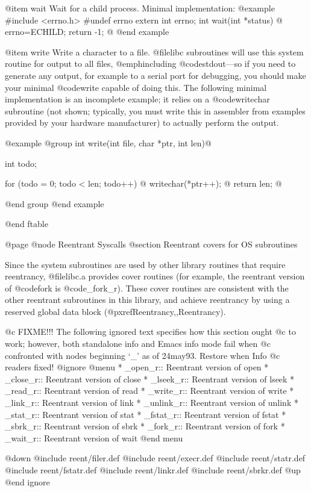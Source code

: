 @item wait
Wait for a child process.  Minimal implementation:
@example
#include <errno.h>
#undef errno
extern int errno;
int wait(int *status) @{
  errno=ECHILD;
  return -1;
@}
@end example

@item write
Write a character to a file.  @file{libc} subroutines will use this
system routine for output to all files, @emph{including}
@code{stdout}---so if you need to generate any output, for example to a
serial port for debugging, you should make your minimal @code{write}
capable of doing this.  The following minimal implementation is an
incomplete example; it relies on a @code{writechar} subroutine (not
shown; typically, you must write this in assembler from examples
provided by your hardware manufacturer) to actually perform the output.

@example
@group
int write(int file, char *ptr, int len)@{
    int todo;
  
    for (todo = 0; todo < len; todo++) @{
        writechar(*ptr++);
    @}
    return len;
@}
@end group
@end example

@end ftable

@page
@node Reentrant Syscalls
@section Reentrant covers for OS subroutines

Since the system subroutines are used by other library routines that
require reentrancy, @file{libc.a} provides cover routines (for example,
the reentrant version of @code{fork} is @code{_fork_r}).  These cover
routines are consistent with the other reentrant subroutines in this
library, and achieve reentrancy by using a reserved global data block
(@pxref{Reentrancy,,Reentrancy}).

@c FIXME!!! The following ignored text specifies how this section ought
@c to work;  however, both standalone info and Emacs info mode fail when
@c confronted with nodes beginning `_' as of 24may93.  Restore when Info
@c readers fixed!
@ignore
@menu
* _open_r::	Reentrant version of open
* _close_r::	Reentrant version of close
* _lseek_r::	Reentrant version of lseek
* _read_r::	Reentrant version of read
* _write_r::	Reentrant version of write
* _link_r::     Reentrant version of link
* _unlink_r::   Reentrant version of unlink
* _stat_r::     Reentrant version of stat
* _fstat_r::    Reentrant version of fstat
* _sbrk_r::     Reentrant version of sbrk
* _fork_r::	Reentrant version of fork
* _wait_r::	Reentrant version of wait
@end menu

@down
@include reent/filer.def
@include reent/execr.def
@include reent/statr.def
@include reent/fstatr.def
@include reent/linkr.def
@include reent/sbrkr.def
@up
@end ignore

